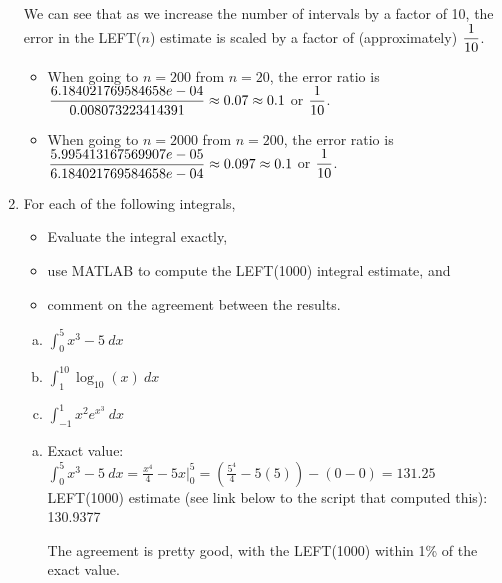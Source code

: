 \begin{enumerate}[1.]
\begin{Solution}
\begin{enumerate}[(a)]


\end{enumerate}

We can see that as we increase the number of intervals by a factor of
10, the error in the LEFT($n$) estimate is scaled by a factor of
(approximately) $\displaystyle \frac{1}{10}$.

\begin{itemize}
\item When going to $n=200$ from $n=20$, the error ratio is $\displaystyle \frac{6.184021769584658e-04}{0.008073223414391} \approx 0.07 \approx 0.1$ or $\displaystyle \frac{1}{10}$.
\item When going to $n=2000$ from $n=200$, the error ratio is $\displaystyle \frac{5.995413167569907e-05}{6.184021769584658e-04}
 \approx 0.097\approx 0.1$ or $\displaystyle \frac{1}{10}$.
\end{itemize}


\end{Solution}

\item \begin{Question}
For each of the following integrals, 
\begin{itemize}
\item Evaluate the integral exactly, 
\item use MATLAB to compute the LEFT(1000) integral estimate, and
\item comment on the agreement between the results.
\end{itemize}
\begin{enumerate}[(a)]
\item $\displaystyle \int_0^5 x^3 - 5~dx$  
\item $\displaystyle \int_1^{10} \log_{10}(x)~dx$ 
\item $\displaystyle \int_{-1}^{1} x^2 e^{x^3}~dx$ 
\end{enumerate} 
  \end{Question}

\begin{Solution}
 \begin{enumerate}[(a)]
\item Exact value: $\displaystyle \int_0^5 x^3 - 5~dx = \frac{x^4}{4} - 5x \Big|_0^5 = 
\left(\frac{5^4}{4} - 5(5)\right) - (0-0) = 131.25$ \\
LEFT(1000) estimate (see link below to the script that computed this):  130.9377

The agreement is pretty good, with the LEFT(1000) within 1\% of the exact value.


\end{enumerate}
\end{Solution}
\end{enumerate}
